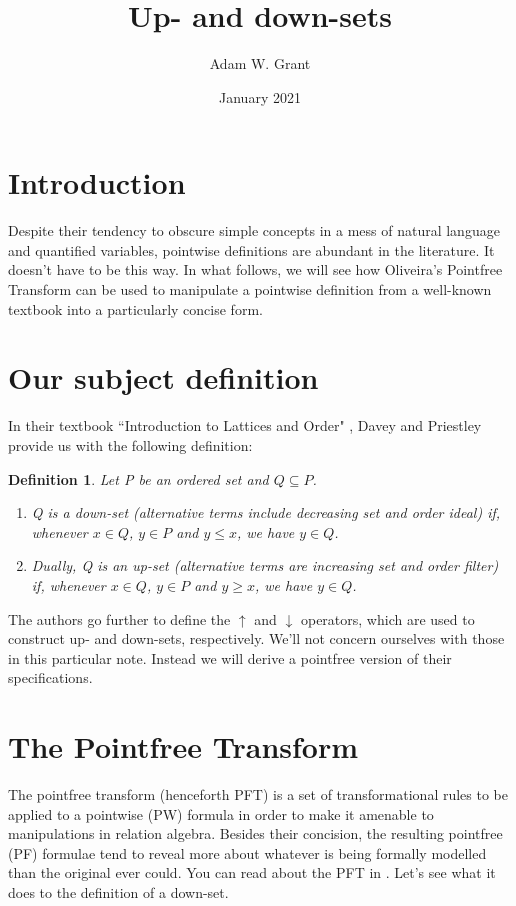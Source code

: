 \documentclass{article}
\title{Up- and down-sets}
\author{Adam W. Grant }
\date{January 2021}
\newtheorem*{defn}{Definition}
\begin{document}
\maketitle

\section{Introduction}

Despite their tendency to obscure simple concepts in a mess of natural language and quantified variables, pointwise definitions are abundant in the literature.  It doesn't have to be this way.  In what follows, we will see how Oliveira's Pointfree Transform can be used to manipulate a pointwise definition from a well-known textbook into a particularly concise form.

\section{Our subject definition}
In their textbook ``Introduction to Lattices and Order" \cite{davey_priestley_2002}, Davey and Priestley provide us with the following definition:

\begin{defn}
Let P be an ordered set and $Q \subseteq P$.
\begin{enumerate}
    \item Q is a down-set (alternative terms include decreasing set and order ideal) if, whenever $x \in Q$, $y \in P$ and $y \leq x$, we have $y \in Q$.
    \item Dually, Q is an up-set (alternative terms are increasing set and order filter) if, whenever $x \in Q$, $y \in P$ and $y \geq x$, we have $y \in Q$.
\end{enumerate}
\end{defn}
The authors go further to define the $\uparrow$ and $\downarrow$ operators, which are used to construct up- and down-sets, respectively.  We'll not concern ourselves with those in this particular note.  Instead we will derive a pointfree version of their specifications.

\section{The Pointfree Transform}
The pointfree transform (henceforth PFT) is a set of transformational rules to be applied to a pointwise (PW) formula in order to make it amenable to manipulations in relation algebra.  Besides their concision, the resulting pointfree (PF) formulae tend to reveal more about whatever is being formally modelled than the original ever could.  You can read about the PFT in \cite{Oliveira2009}. Let's see what it does to the definition of a down-set.
\end{document}
